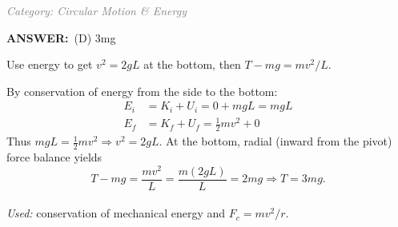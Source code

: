 \documentclass[12pt, a4paper]{article}
\makeatletter
\newcommand{\finalanswer}[1]{\textbf{ANSWER:}~#1}
\newif\if@categoryprinted
\newcommand{\category}[1]{\if@categoryprinted\relax\else\textit{\textcolor{gray}{Category: #1}}\global\@categoryprintedtrue\fi}
\makeatother
\begin{document}
\begin{CJK*}{UTF8}{gbsn}
\begin{enumerate}[itemsep=1.0em, topsep=0.6em]
\category{Circular Motion \& Energy}
\begin{answerbox}
\finalanswer{(D) 3mg}
\end{answerbox}
\begin{insightbox}
Use energy to get $v^2=2gL$ at the bottom, then $T-mg=mv^2/L$.
\end{insightbox}
\begin{solutionbox}
By conservation of energy from the side to the bottom:
\begin{align*}
E_i &= K_i + U_i = 0 + mgL = mgL \\
E_f &= K_f + U_f = \tfrac{1}{2}mv^2 + 0
\end{align*}
Thus $mgL = \tfrac{1}{2}mv^2 \Rightarrow v^2 = 2gL$. At the bottom, radial (inward from the pivot) force balance yields
\[
T - mg = \frac{mv^2}{L} = \frac{m(2gL)}{L} = 2mg \Rightarrow T = 3mg.
\]
\\
\emph{Used:} conservation of mechanical energy and $F_c=mv^2/r$.
\end{solutionbox}

\newpage


\end{enumerate}
\end{CJK*}
\end{document}
